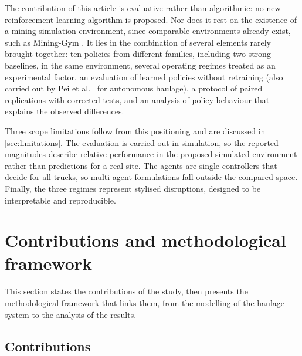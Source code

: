 \documentclass[11pt,a4paper]{article}
\newif\ifrevmarks
\newcommand{\revtag}[1]{\ifrevmarks\textsuperscript{\textcolor{red!70!black}{\scriptsize[#1]}}\fi}
\newcommand{\rev}[2]{\ifrevmarks{\color{revcolor}#2}\revtag{#1}\else#2\fi}
\newenvironment{revbloc}[1]{\par\ifrevmarks\color{revcolor}\noindent\revtag{#1}\ \fi}{\par}
\begin{document}
\begin{revbloc}{M26, M27}
The contribution of this article is evaluative rather than algorithmic: no new reinforcement learning algorithm is proposed. Nor does it rest on the existence of a mining simulation environment, since comparable environments already exist, such as Mining-Gym \cite{Banerjee2025}. It lies in the combination of several elements rarely brought together: \rev{T31}{ten policies from different families, including two strong baselines,} in the same environment, several operating regimes treated as an experimental factor, an evaluation of learned policies without retraining \rev{v3}{(also carried out by Pei et al.~\cite{Pei2025} for autonomous haulage)}, a protocol of paired replications with corrected tests, and an analysis of policy behaviour that explains the observed differences.

Three scope limitations follow from this positioning and are discussed in \cref{sec:limitations}. The evaluation is carried out in simulation, so the reported magnitudes describe relative performance in the proposed simulated environment rather than predictions for a real site. The agents are single controllers that decide for all trucks, so multi-agent formulations \cite{Zhao2025} fall outside the compared space. Finally, the three regimes represent stylised disruptions, designed to be interpretable and reproducible.
\end{revbloc}



\section{Contributions and methodological framework}
\label{sec:contributions}

This section states the contributions of the study, then presents the methodological framework that links them, from the modelling of the haulage system to the analysis of the results.

\subsection{Contributions}
\end{document}
